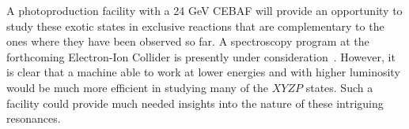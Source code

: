 A photoproduction facility with a 24 GeV CEBAF will provide an opportunity to study these exotic states in exclusive reactions that are complementary to the ones where they have been observed so far.  A spectroscopy program at the forthcoming Electron-Ion Collider is presently under consideration~\cite{AbdulKhalek:2021gbh}. However, it is clear that a machine able to work at lower energies and with higher luminosity would be much more efficient in studying many of the $XYZP$ states.  Such a facility could provide much needed insights into the nature of these intriguing resonances.

